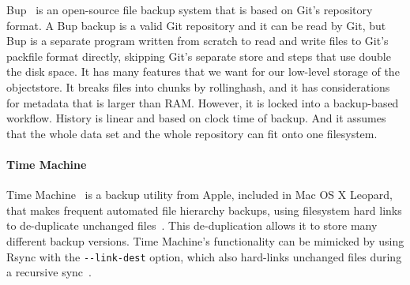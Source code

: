 Bup~\cite{bup_homepage} is an open-source file backup system that is based on
Git's \gls{repository} format. A Bup backup is a valid Git \gls{repository} and
it can be read by Git, but Bup is a separate program written from scratch to
read and write files to Git's \gls{packfile} format directly, skipping Git's
separate store and  steps that use double the disk
space. It has many features that we want for our low-level storage of the
\gls{objectstore}. It breaks files into chunks by \gls{rollinghash}, and it has
considerations for metadata that is larger than RAM. However, it is locked into
a backup-based workflow. History is linear and based on clock time of backup.
And it assumes that the whole data set and the whole \gls{repository} can fit
onto one filesystem.


\paragraph{Time Machine}

Time Machine~\cite{timemachine_patent} is a backup utility from Apple, included
in Mac OS X Leopard, that makes frequent automated file hierarchy backups, using
filesystem hard links to de-duplicate unchanged files~\cite{timemachine_magic}.
This de-duplication allows it to store many different backup versions. Time
Machine's functionality can be mimicked by using Rsync with the
\lstinline{--link-dest} option, which also hard-links unchanged files during a
recursive sync~\cite{timemachine_foreveryunix}.
